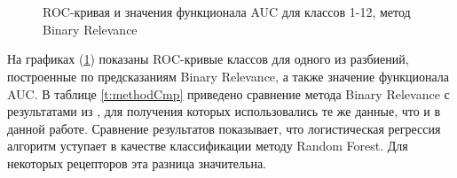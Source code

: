 \documentclass[12pt,twoside]{article}
\begin{document}
\begin{figure}[H]
	\\
	\\
	\caption{ROC-кривая и значения функционала AUC для классов 1-12, метод Binary Relevance}
	\label{fg:BR}
\end{figure}

На графиках (\ref{fg:BR}) показаны ROC-кривые классов для одного из разбиений, построенные по предсказаниям Binary Relevance, а также значение функционала AUC. В таблице \ref{t:methodCmp} приведено сравнение метода Binary Relevance с результатами из \cite{qsar}, для получения которых использовались те же данные, что и в данной работе. Сравнение результатов показывает, что логистическая регрессия алгоритм уступает в качестве классификации методу Random Forest. Для некоторых рецепторов эта разница значительна.
\end{document}
